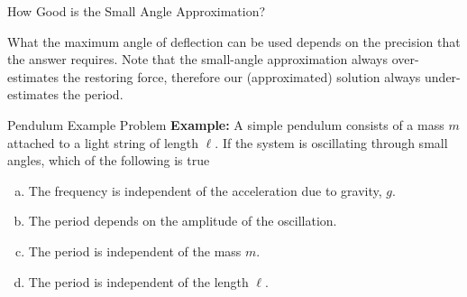 \documentclass[12pt,compress,aspectratio=169]{beamer}
\begin{document}
\begin{frame}{How Good is the Small Angle Approximation?}
  \begin{center}
  \end{center}
  What the maximum angle of deflection can be used depends on the precision
  that the answer requires. Note that the small-angle approximation always
  over-estimates the restoring force, therefore our (approximated) solution
  always under-estimates the period.
\end{frame}



\begin{frame}{Pendulum Example Problem}
  \textbf{Example:} A simple pendulum consists of a mass $m$ attached to a
  light string of length $\ell$. If the system is oscillating through small
  angles, which of the following is true
  \begin{enumerate}[(a)]
  \item The frequency is independent of the acceleration due to gravity, $g$.
  \item The period depends on the amplitude of the oscillation.
  \item The period is independent of the mass $m$.
  \item The period is independent of the length $\ell$.
  \end{enumerate}
\end{frame}
\end{document}
